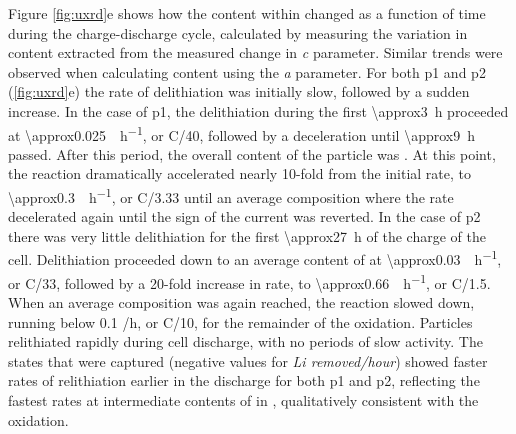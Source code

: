 \documentclass{article}
\begin{document}
Figure \ref{fig:uxrd}e shows how the  content within \nca{}
changed as a function of time during the charge-discharge cycle,
calculated by measuring the variation in  content extracted
from the measured change in \emph{c} parameter. Similar trends were
observed when calculating  content using the \emph{a}
parameter. For both \gls{p1} and \gls{p2} (\ref{fig:uxrd}e) the rate
of delithiation was initially slow, followed by a sudden
increase. In the case
of \gls{p1}, the delithiation during the first \SI{\approx3}{\hour}
proceeded at \SI{\approx0.025}{\per\hour}, or C/40, followed by
a deceleration until \SI{\approx9}{\hour} passed. After this period,
the overall content of the particle was
. At this point, the
reaction dramatically accelerated nearly 10-fold from the initial
rate, to \SI{\approx0.3}{\per\hour}, or C/3.33 until an average
composition  where the rate decelerated again until the sign
of the current was reverted. In the case of \gls{p2} there was very
little delithiation for the first \SI{\approx27}{\hour} of the charge
of the cell. Delithiation proceeded down to an average content of
 at \SI{\approx0.03}{\per\hour}, or C/33, followed by
a 20-fold increase in rate, to \SI{\approx0.66}{\per\hour}, or
C/1.5. When an average composition  was again reached, the
reaction slowed down, running below 0.1 /h, or C/10, for the
remainder of the oxidation. Particles relithiated rapidly during cell
discharge, with no periods of slow activity. The states that were
captured (negative values for \emph{Li removed/hour}) showed faster
rates of relithiation earlier in the discharge for both \gls{p1} and
\gls{p2}, reflecting the fastest rates at intermediate contents of
 in , qualitatively consistent with the oxidation.
\end{document}
